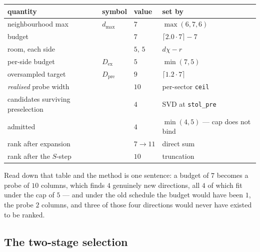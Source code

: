 \documentclass[11pt,a4paper]{article}
\newcommand{\Dex}{D_{\mathrm{ex}}}
\newcommand{\Dpre}{D_{\mathrm{pre}}}
\newcommand{\code}[1]{\texttt{\small #1}}
\begin{document}
\begin{center}
\small
\begin{tabular}{@{}llll@{}}
\toprule
quantity & symbol & value & set by \\
\midrule
neighbourhood max        & $d_{\max}$ & $7$    & $\max(6,7,6)$ \\
budget                   &            & $7$    & $\lceil 2.0\cdot 7\rceil - 7$ \\
room, each side          &            & $5,\,5$ & $d\chi - r$ \\
per-side budget          & $\Dex$     & $5$    & $\min(7, 5)$ \\
oversampled target       & $\Dpre$    & $9$    & $\lceil 1.2\cdot 7\rceil$ \\
\emph{realised} probe width &         & $10$   & per-sector \code{ceil} \\
candidates surviving preselection &   & $4$    & SVD at \code{stol\_pre} \\
admitted                 &            & $4$    & $\min(4, 5)$ --- cap does not bind \\
rank after expansion     &            & $7 \to 11$ & direct sum \\
rank after the $S$-step  &            & $10$   & truncation \\
\bottomrule
\end{tabular}
\end{center}

\noindent
Read down that table and the method is one sentence: a budget of $7$ becomes a probe of $10$
columns, which finds $4$ genuinely new directions, all $4$ of which fit under the cap of $5$ --- and
under the old schedule the budget would have been $1$, the probe $2$ columns, and three of those
four directions would never have existed to be ranked.

\subsection{The two-stage selection}
\label{sec:twostage}
\end{document}
